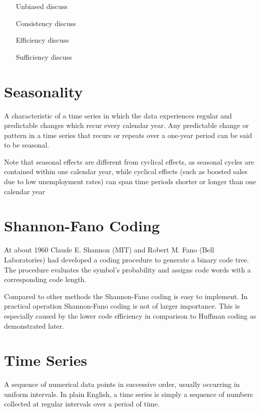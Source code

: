 \begin{enumerate}
\begin{itemize}
	\item[Unbiased] discuss
	\item[Consistency] discuss
	\item[Efficiency] discuss
	\item[Sufficiency] discuss
\end{itemize}



\section{Seasonality}
A characteristic of a time series in which the data experiences regular and predictable changes which recur every calendar year. Any predictable change or pattern in a time series that recurs or repeats over a one-year period can be said to be seasonal.

Note that seasonal effects are different from cyclical effects, as seasonal cycles are contained within one calendar year, while cyclical effects (such as boosted sales due to low unemployment rates) can span time periods shorter or longer than one calendar year


\section{Shannon-Fano Coding}

At about 1960 Claude E. Shannon (MIT) and Robert M. Fano (Bell Laboratories) had developed a coding procedure to generate a binary code tree. The procedure evaluates the symbol's probability and assigns code words with a corresponding code length.

Compared to other methods the Shannon-Fano coding is easy to implement. In practical operation Shannon-Fano coding is not of larger importance. This is especially caused by the lower code efficiency in comparison to Huffman coding as demonstrated later.



\section{Time Series}

A sequence of numerical data points in successive order, usually occurring in uniform intervals. In plain English, a time series is simply a sequence of numbers collected at regular intervals over a period of time.






\end{enumerate}

